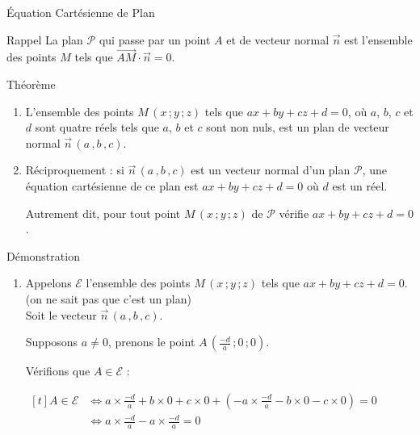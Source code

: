\documentclass{coursbook}
\begin{document}
    \begin{Gpartie}{Équation Cartésienne de Plan} 
        \begin{Spartie}{Rappel} 
            La plan $\mathcal{P}$ qui passe par un point $A$ et de vecteur normal $\vec{n}$ est l'ensemble des points $M$ tels que $\overrightarrow{AM}\cdot\vec{n}=0$.
        \end{Spartie}
        \begin{Spartie}{Théorème} 
            \begin{enumerate}[(1)]
                \item   L'ensemble des points $M\,\left(x\,; y\,; z\right)$ tels que $ax+by+cz+d=0$, où $a$, $b$, $c$ et $d$ sont quatre réels tels que $a$, $b$ et $c$ sont non nuls, est un plan de vecteur normal $\vec{n}\,\left(a\,, b\,, c\right)$.
                
                \item   Réciproquement : si $\vec{n}\,\left(a\,, b\,, c\right)$ est un vecteur normal d'un plan $\mathcal{P}$, une équation cartésienne de ce plan est $ax+by+cz+d=0$ où $d$ est un réel.
                
                Autrement dit, pour tout point $M\,\left(x\,; y\,; z\right)$ de $\mathcal{P}$ vérifie $ax+by+cz+d=0$.
            \end{enumerate}
            \vfill
            \pagebreak
            \begin{SSpartie}{Démonstration} 
                \begin{enumerate}[(1)]
                    \item   Appelons $\mathcal{E}$ l'ensemble des points $M\,\left(x\,; y\,; z\right)$ tels que $ax+by+cz+d=0$. (on ne sait pas que c'est un plan) \\ Soit le vecteur $\vec{n}\,\left(a\,, b\,, c\right)$.
                    
                    Supposons $a\neq 0$, prenons le point $A\,\left(\frac{-d}{a}\,; 0\,; 0\right)$.

                    Vérifions que $A\in\mathcal{E}$ :

                    $\begin{aligned}[t]
                        A\in\mathcal{E}&\iff a\times\tfrac{-d}{a}+b\times0+c\times0+\left(-a\times\tfrac{-d}{a}-b\times0-c\times0\right)=0 \\
                        &\iff a\times\tfrac{-d}{a}-a\times\tfrac{-d}{a}=0
                    \end{aligned}$


\end{enumerate}
\end{SSpartie}
\end{Spartie}
\end{Gpartie}
\end{document}
